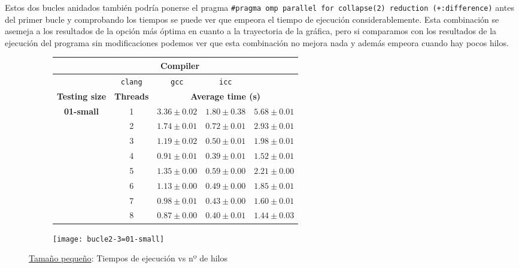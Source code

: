 \par Estos dos bucles anidados también podría ponerse el pragma \texttt{\#pragma omp parallel for collapse(2) reduction (+:difference)}
antes del primer bucle y comprobando los tiempos se puede ver que empeora el tiempo de ejecución considerablemente. Esta combinación se asemeja a los resultados de 
la opción más óptima en cuanto a la trayectoria de la gráfica, pero si comparamos con los resultados de la ejecución del programa sin 
modificaciones podemos ver que esta combinación no mejora nada y además empeora cuando hay pocos hilos. 

\begin{figure}[H]
    \centering
    \begin{subfigure}{0.4\textwidth}
        \begin{adjustbox}{width=\textwidth} 
        \begin{tabular}{|c|c|c|c|c|}
            \hline
            \rowcolor{azul} \multicolumn{2}{|c|}{}&\multicolumn{3}{c|}{\textbf{Compiler}} \\ \hline
            \rowcolor{azul} \multicolumn{2}{|c|}{}&\texttt{clang}&\texttt{gcc}&\texttt{icc}\\ \hline
            \rowcolor{azul} \textbf{Testing size} & \textbf{Threads}&\multicolumn{3}{c|}{\textbf{Average time (s)}} \\ \hline
            \multirow{8}{1cm}{\textbf{01-small}} & 1 & \(3.36\pm{0.02}\) & \(1.80\pm{0.38}\) & \(5.68\pm{0.01}\) \\ \cline{2-5}
            & 2 & \(1.74\pm{0.01}\) & \(0.72\pm{0.01}\) & \(2.93\pm{0.01}\) \\ \cline{2-5}
            & 3 & \(1.19\pm{0.02}\) & \(0.50\pm{0.01}\) & \(1.98\pm{0.01}\) \\ \cline{2-5}
            & 4 & \(0.91\pm{0.01}\) & \(0.39\pm{0.01}\) & \(1.52\pm{0.01}\) \\ \cline{2-5}
            & 5 & \(1.35\pm{0.00}\) & \(0.59\pm{0.00}\) & \(2.21\pm{0.00}\) \\ \cline{2-5}
            & 6 & \(1.13\pm{0.00}\) & \(0.49\pm{0.00}\) & \(1.85\pm{0.01}\) \\ \cline{2-5}
            & 7 & \(0.98\pm{0.01}\) & \(0.43\pm{0.00}\) & \(1.60\pm{0.01}\) \\ \cline{2-5}
            & 8 & \(0.87\pm{0.00}\) & \(0.40\pm{0.01}\) & \(1.44\pm{0.03}\) \\ \hline
        \end{tabular}
        \end{adjustbox}
    \end{subfigure}
    \hfill
    \begin{subfigure}{0.5\textwidth}
        \texttt{[image: bucle2-3=01-small]}
    \end{subfigure}
    \caption{\underline{Tamaño pequeño}: Tiempos de ejecución vs nº de hilos}
    \label{fig:bucle2-3=01-small}
\end{figure}

